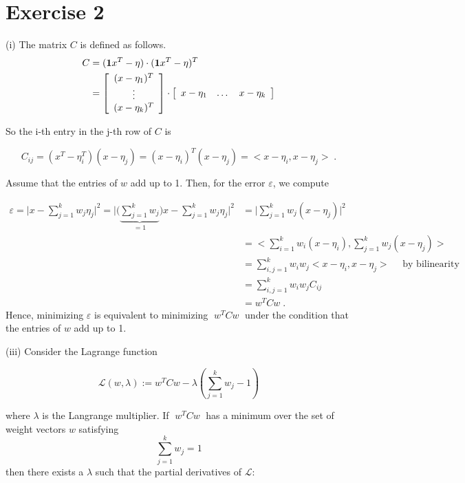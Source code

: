 \section*{Exercise 2}
(i) The matrix $C$ is defined as follows. 
\begin{align}
            C &= (\mathbf{1}x^T - \eta) \cdot (\mathbf{1}x^T - \eta)^T \\
            &= \left[  {\begin{array}{c} (x - \eta_1)^T \\   \vdots \\   (x - \eta_k)^T \\     \end{array} } \right]  \cdot \left[  \begin{array}{c c c} x-\eta_1 & \dots & x-\eta_k  \end{array} \right]
\end{align}

So the i-th entry in the j-th row of $C$ is 

$$C_{ij} = (x^T - \eta_i^T)(x - \eta_j) = (x - \eta_i)^T (x-\eta_j) = <x - \eta_i, x-\eta_j>\; . $$

Assume that the entries of $w$ add up to 1. Then, for the error $\varepsilon$, we compute

\begin{align}
\varepsilon = \Big|x - \sum_{j=1}^k w_j \eta_j \Big|^2 
                            = \Big| \big(\underbrace{\sum_{j=1}^k  w_j}_{= 1}\big)x - \sum_{j=1}^k  w_j \eta_j \Big|^2   
                            &= \Big| \sum_{j=1}^k  w_j (x - \eta_j) \Big|^2   \\ 
                            &= <\sum_{i=1}^k  w_i (x - \eta_i), \sum_{j=1}^k  w_j (x - \eta_j) > \\
                            &= \sum_{i,j = 1}^k w_i w_j<x - \eta_i, x - \eta_j> \quad \text{ by bilinearity} \\
                            &= \sum_{i,j = 1}^k w_i w_j C_{ij} \\
                            &= w^T C w \; .
                            \end{align} 
Hence, minimizing $\varepsilon$ is equivalent to minimizing $\; w^T C w \;$ under the condition that the entries of $w$ add up to 1.
                  
(iii) Consider the Lagrange function

$$ \mathcal{L}(w, \lambda) := w^T C w - \lambda \left(\sum_{j=1}^k w_j -1\right) $$

where $\lambda$ is the Langrange multiplier. If $\; w^TCw \;$ has a minimum over the set of weight vectors $w$ satisfying $$\sum_{j=1}^k w_j = 1$$ then there exists a $\lambda$ such that the partial derivatives of $\mathcal{L}$:

